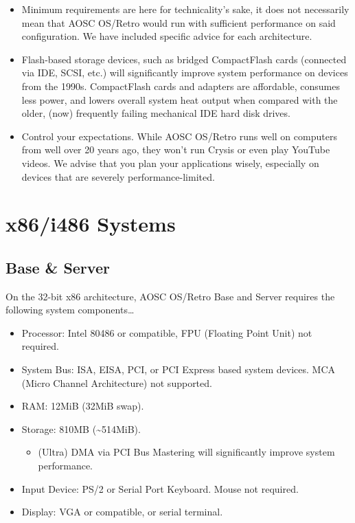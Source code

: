     \begin{itemize}
        \item Minimum requirements are here for technicality's sake,
            it does not necessarily mean that AOSC OS/Retro would run with sufficient performance
            on said configuration. We have included specific advice for each architecture.
        \item Flash-based storage devices, such as bridged CompactFlash cards
            (connected via IDE, SCSI, etc.) will significantly improve system performance on devices from the 1990s.
            CompactFlash cards and adapters are affordable, consumes less power,
            and lowers overall system heat output when compared with the older,
            (now) frequently failing mechanical IDE hard disk drives.
        \item Control your expectations. While AOSC OS/Retro runs well on computers from well over 20 years ago,
            they won't run Crysis or even play YouTube videos. We advise that you plan your applications wisely,
            especially on devices that are severely performance-limited.
    \end{itemize}


    \section{x86/i486 Systems}

    \subsection{Base \& Server}

    On the 32-bit x86 architecture, AOSC OS/Retro Base and Server requires the following system components\ldots

    \begin{itemize}
        \item Processor: Intel 80486 or compatible, FPU (Floating Point Unit) not required.
        \item System Bus: ISA, EISA, PCI, or PCI Express based system devices. MCA (Micro Channel Architecture) not supported.
        \item RAM: 12MiB (32MiB swap).
        \item Storage: 810MB ({\textasciitilde}514MiB).
            \begin{itemize}
                \item (Ultra) DMA via PCI Bus Mastering will significantly improve system performance.
            \end{itemize}
        \item Input Device: PS/2 or Serial Port Keyboard. Mouse not required.
        \item Display: VGA or compatible, or serial terminal.
    \end{itemize}

